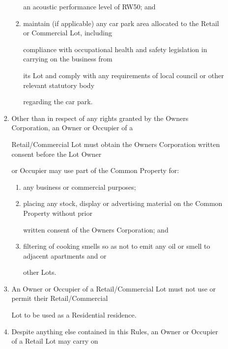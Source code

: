 \documentclass{article}
\begin{document}
\begin{enumerate}[label=\arabic*.]
\begin{enumerate}[label=\arabic{enumi}.\arabic*.]
\begin{enumerate}[label=(\arabic*)]
\begin{enumerate}[label=(\alph*)]
{\fontsize{10.02}{1}an acoustic performance level of RW50; and }

\item {\fontsize{9.962}{1} maintain (if applicable) any car park area allocated to the Retail or Commercial Lot, including }

{\fontsize{10.02}{1}compliance with occupational health and safety legislation in carrying on the business from }

{\fontsize{10.02}{1}its Lot and comply with any requirements of local council or other relevant statutory body }

{\fontsize{10.02}{1}regarding the car park. }

\end{enumerate}
\item {\fontsize{9.962}{1} Other than in respect of any rights granted by the Owners Corporation, an Owner or Occupier of a }

{\fontsize{10.02}{1}Retail/Commercial Lot must obtain the Owners Corporation written consent before the Lot Owner }

{\fontsize{10.02}{1}or Occupier may use part of the Common Property for: }

\newpage

\begin{enumerate}[label=(\alph*)]
\item {\fontsize{9.962}{1} any business or commercial purposes; }

\item {\fontsize{9.962}{1} placing any stock, display or advertising material on the Common Property without prior }

{\fontsize{10.02}{1}written consent of the Owners Corporation; and }

\item {\fontsize{9.962}{1} filtering of cooking smells so as not to emit any oil or smell to adjacent apartments and or }

{\fontsize{10.02}{1}other Lots. }

\end{enumerate}
\item {\fontsize{9.962}{1} An Owner or Occupier of a Retail/Commercial Lot must not use or permit their Retail/Commercial }

{\fontsize{10.02}{1}Lot to be used as a Residential residence. }

\item {\fontsize{9.962}{1} Despite anything else contained in this Rules, an Owner or Occupier of a Retail Lot may carry on }


\end{enumerate}
\end{enumerate}
\end{enumerate}
\end{document}
